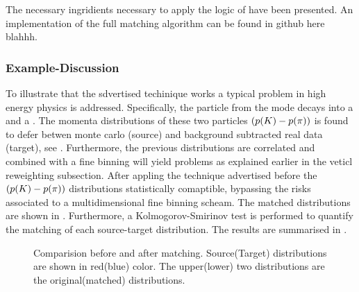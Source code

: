 The necessary ingridients necessary to apply the logic of \figref{} have been presented.
An implementation of the full matching algorithm can be found in github here blahhh.

\subsubsection{Example-Discussion}
To illustrate that the sdvertised techinique works a typical problem in high energy physics is addressed.
Specifically, the \Kstarz particle from the \BsJpsiKst mode decays into a \kaon and a \pion. The momenta
distributions of these two particles $\left( \mbox{$p$}(K)-\mbox{$p$}(\pi) \right)$ is found to defer betwen
monte carlo (source) and background subtracted real data (target), see . Furthermore,
the previous distributions are correlated and combined with a fine binning will yield problems as explained
earlier in the veticl reweighting subsection. After appling the technique advertised before the
$\left( \mbox{$p$}(K)-\mbox{$p$}(\pi) \right)$ distributions statistically comaptible, bypassing the risks associated
to a multidimensional fine binning scheam. The matched distributions are shown in \figref{}. Furthermore,
a Kolmogorov-Smirinov test is performed to quantify the matching of each source-target distribution.
The results are summarised in .

\begin{figure}[t]
  \centering
  \begin{subfigure}{0.5\textwidth}
    \raggedright
    \scalebox{1.15}{}
    \caption{}
    \label{kplus_rew_original}
  \end{subfigure}%
  \hfill
  \begin{subfigure}{0.5\textwidth}
    \raggedleft
    \scalebox{1.15}{}
    \caption{}
    \label{pminus_rew_original}
  \end{subfigure}
\begin{subfigure}{0.5\textwidth}
    \raggedright
    \scalebox{1.15}{}
    \caption{}
    \label{kplus_rew_matched}
  \end{subfigure}%
  \hfill
  \begin{subfigure}{0.5\textwidth}
    \raggedleft
    \scalebox{1.15}{}
    \caption{}
    \label{pminus_rew_matched}
  \end{subfigure}
  \caption{Comparision before and after matching. Source(Target) distributions are shown in red(blue) color.
   The upper(lower) two distributions are the original(matched) distributions.}
  \label{rew_original}
\end{figure}

